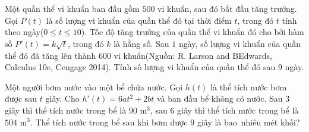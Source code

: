 \begin{bt}%
	Một quần thể vi khuẩn ban đầu gồm $500$ vi khuẩn, sau đó bắt đầu tăng trưởng. Gọi $P(t)$ là số lượng vi khuẩn của quần thể đó tại thời điểm $t$,  trong đó $t$ tính theo ngày($0\le t\le 10$). Tốc độ tăng trưởng của quần thể vi khuẩn đó cho bởi hàm số $P'(t)=k\sqrt{t}$, trong đó $k$ là hằng số. Sau $1$ ngày, số lượng vi khuẩn của quần thể đó đã tăng lên thành $600$ vi khuẩn(Nguồn: R. Larson and BEdwards, Calculus 10e, Cengage 2014). Tính số lượng vi khuẩn của quần thể đó sau $9$ ngày.
\end{bt}

\begin{bt}%
	Một người bơm nước vào một bể chứa nước. Gọi $h(t)$ là thể tích nước bơm được sau $t$ giây. Cho $h'(t)=6at^2+2bt$ và ban đầu bể không có nước. Sau $3$ giây thì thể tích nước trong bể là $90$ m$^3$, sau  $6$ giây thì thể tích nước trong bể là $504$ m$^3$. Thể tích nước trong bể sau khi bơm được $9$ giây là bao~nhiêu mét khối?
\end{bt}

